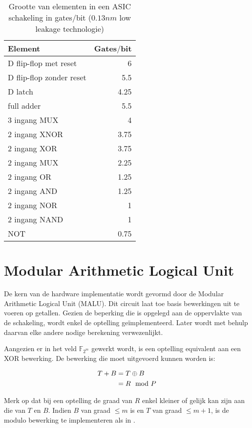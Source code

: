 \begin{table}[h]
	\caption{Grootte van elementen in een ASIC schakeling in gates$/$bit ($0.13 nm$ low leakage technologie)\cite{cell-databook}}
	\label{tabel-implementatie-beperkingen-elementen-gatecount}
	\begin{tabular}{|l|r|}
		\hline
		Element			& Gates$/$bit\\
		\hline
		D flip-flop met reset	& 6\\
		D flip-flop zonder reset	& 5.5\\
		D latch			& 4.25\\
		full adder		& 5.5\\
		3 ingang MUX	& 4\\
		2 ingang XNOR	& 3.75\\
		2 ingang XOR	& 3.75\\
		2 ingang MUX	& 2.25\\
		2 ingang OR		& 1.25\\
		2 ingang AND	& 1.25\\
		2 ingang NOR	& 1\\
		2 ingang NAND	& 1\\
		NOT				& 0.75\\
		\hline		
	\end{tabular}
\end{table}

\section{Modular Arithmetic Logical Unit}\label{sectie-implementatie-malu}

De kern van de hardware implementatie wordt gevormd door de Modular Arithmetic Logical Unit (MALU)\cite{sakiyama}. Dit circuit laat toe basis bewerkingen uit te voeren op getallen. Gezien de beperking die is opgelegd aan de oppervlakte van de schakeling, wordt enkel de optelling ge\"implementeerd. Later wordt met behulp daarvan elke andere nodige berekening verwezenlijkt.

Aangezien er in het veld $\mathbb{F}_{2^m}$ gewerkt wordt, is een optelling equivalent aan een XOR bewerking. De bewerking die moet uitgevoerd kunnen worden is:

\[\begin{aligned}
T + B	&= T \oplus B\\
		&= R \mod P
\end{aligned}\]

Merk op dat bij een optelling de graad van $R$ enkel kleiner of gelijk kan zijn aan die van $T$ en $B$. Indien $B$ van graad $\leq m$ is en $T$ van graad $\leq m + 1$, is de modulo bewerking te implementeren als in .

